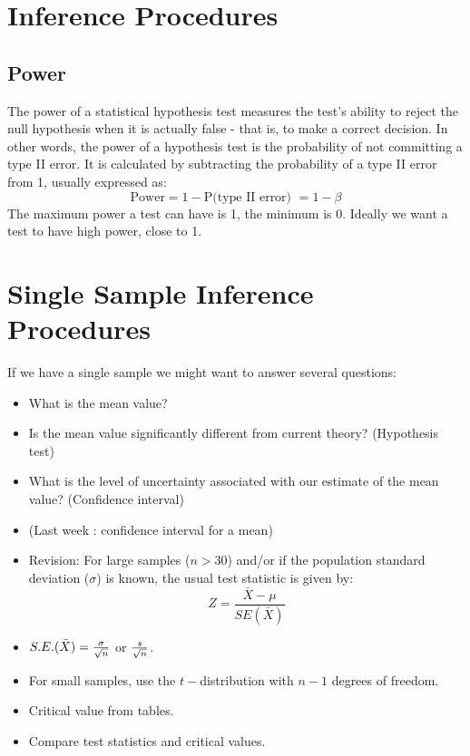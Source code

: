 





\section{Inference Procedures}
\subsection{Power }
The power of a statistical hypothesis test measures the test's ability to reject the null hypothesis when it is actually false - that is, to make a correct decision. In other words, the power of a hypothesis test is the probability of not committing a type II error. It is calculated by subtracting the probability of a type II error from 1, usually expressed as: 
\[\mbox{Power} = 1 - \mbox{P(type II error) } = 1- \beta \]The maximum power a test can have is 1, the minimum is 0. Ideally we want a test to have high power, close to 1.

\section{Single Sample Inference Procedures}
If we have a single sample we might want to answer several
questions:
\begin{itemize}
	\item What is the mean value? \item Is the mean value
	significantly different from current theory? (Hypothesis test)
	\item What is the level of uncertainty associated with our
	estimate of the mean value? (Confidence interval)
\end{itemize}

\begin{itemize}
	\item (Last week : confidence interval for a mean) \item Revision:
	For large samples ($n > 30$) and/or if the population standard
	deviation ($\sigma$) is known, the usual test statistic is given
	by: \[Z =\frac{\bar{X} - \mu}{SE(\bar{X})}\]
	
	\item $S.E.(\bar{X}) = { \sigma \over \sqrt{n}} $ or ${s \over \sqrt{n}}$. 
	\item For small samples, use the $t-$distribution with $n-1$ degrees of freedom.
	\item Critical value from tables.
	\item Compare test statistics and critical values.
\end{itemize}

